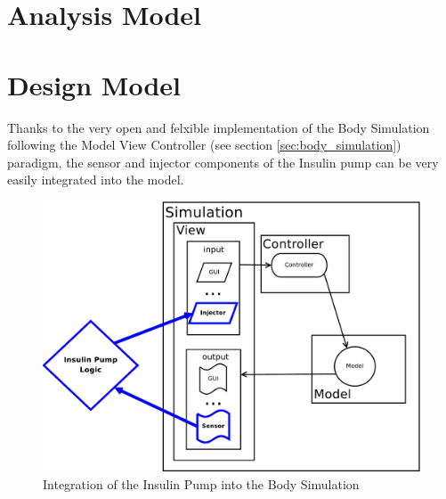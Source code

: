 \section{Analysis Model}


\section{Design Model}
Thanks to the very open and felxible implementation of the Body Simulation
following the Model View Controller (see section \vref{sec:body_simulation})
paradigm, the sensor and injector components of the Insulin pump can be very
easily integrated into the model.

\begin{figure}[htb]
\centering
\includegraphics[scale=0.39]{images/mvc_insulin_pump}
\caption{Integration of the Insulin Pump into the Body Simulation}
\label{fig:mvc_insulin_pump}
\end{figure}
